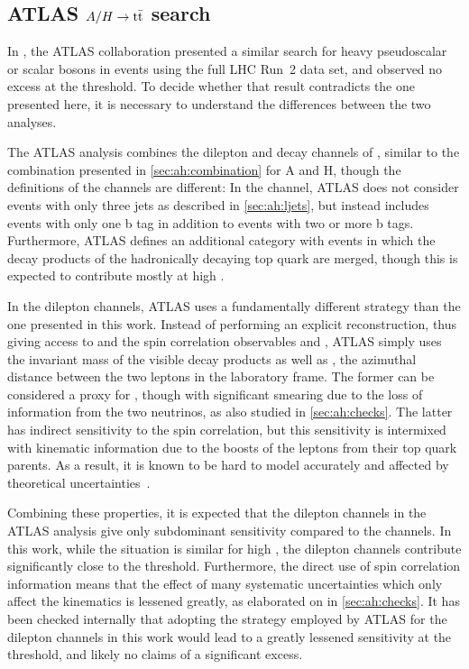 \subsection{ATLAS \texorpdfstring{$A/H \rightarrow \mathrm{t \bar{t}}$}{A/H -> tt} search}

In , the ATLAS collaboration presented a similar search for heavy pseudoscalar or scalar bosons in \ttbar events using the full LHC Run~2 data set, and observed no excess at the \ttbar threshold. To decide whether that result contradicts the one presented here, it is necessary to understand the differences between the two analyses.

The ATLAS analysis combines the dilepton and \ljets decay channels of \ttbar, similar to the combination presented in \cref{sec:ah:combination} for A and H, though the definitions of the channels are different: In the \ljets channel, ATLAS does not consider events with only three jets as described in \cref{sec:ah:ljets}, but instead includes events with only one b tag in addition to events with two or more b tags. Furthermore, ATLAS defines an additional category with \ljets events in which the decay products of the hadronically decaying top quark are merged, though this is expected to contribute mostly at high \mtt.

In the dilepton channels, ATLAS uses a fundamentally different strategy than the one presented in this work. Instead of performing an explicit \ttbar reconstruction, thus giving access to \mtt and the spin correlation observables \chel and \chan, ATLAS simply uses the invariant mass \mbbll of the visible decay products as well as \dphill, the azimuthal distance between the two leptons in the laboratory frame. The former can be considered a proxy for \mtt, though with significant smearing due to the loss of information from the two neutrinos, as also studied in \cref{sec:ah:checks}. The latter has indirect sensitivity to the \ttbar spin correlation, but this sensitivity is intermixed with kinematic information due to the boosts of the leptons from their top quark parents. As a result, it is known to be hard to model accurately and affected by theoretical uncertainties~\cite{CMS:TOP-18-006,ATLAS:2019hau}.

Combining these properties, it is expected that the dilepton channels in the ATLAS analysis give only subdominant sensitivity compared to the \ljets channels. In this work, while the situation is similar for high \mtt, the dilepton channels contribute significantly close to the \ttbar threshold. Furthermore, the direct use of spin correlation information means that the effect of many systematic uncertainties which only affect the kinematics is lessened greatly, as elaborated on in \cref{sec:ah:checks}. It has been checked internally that adopting the strategy employed by ATLAS for the dilepton channels in this work would lead to a greatly lessened sensitivity at the \ttbar threshold, and likely no claims of a significant excess.

